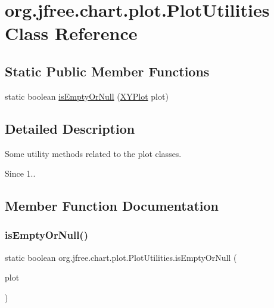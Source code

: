 \hypertarget{classorg_1_1jfree_1_1chart_1_1plot_1_1_plot_utilities}{}\section{org.\+jfree.\+chart.\+plot.\+Plot\+Utilities Class Reference}
\label{classorg_1_1jfree_1_1chart_1_1plot_1_1_plot_utilities}
\subsection*{Static Public Member Functions}
\begin{DoxyCompactItemize}
\item 
static boolean \mbox{\hyperlink{classorg_1_1jfree_1_1chart_1_1plot_1_1_plot_utilities_a0fa68884cd9548dd224b0922ef3df5e7}{is\+Empty\+Or\+Null}} (\mbox{\hyperlink{classorg_1_1jfree_1_1chart_1_1plot_1_1_x_y_plot}{X\+Y\+Plot}} plot)
\end{DoxyCompactItemize}


\subsection{Detailed Description}
Some utility methods related to the plot classes.

\begin{DoxySince}{Since}
1.. 
\end{DoxySince}


\subsection{Member Function Documentation}
\mbox{\label{classorg_1_1jfree_1_1chart_1_1plot_1_1_plot_utilities_a0fa68884cd9548dd224b0922ef3df5e7}} 
\subsubsection{\texorpdfstring{is\+Empty\+Or\+Null()}{isEmptyOrNull()}}
{\footnotesize\ttfamily static boolean org.\+jfree.\+chart.\+plot.\+Plot\+Utilities.\+is\+Empty\+Or\+Null (\begin{DoxyParamCaption}\item[{\mbox{\hyperlink{classorg_1_1jfree_1_1chart_1_1plot_1_1_x_y_plot}{X\+Y\+Plot}}}]{plot }\end{DoxyParamCaption})\hspace{0.3cm}{\ttfamily [static]}}

